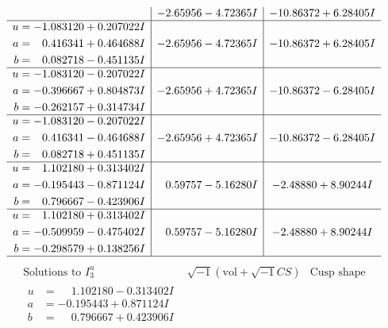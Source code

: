 \documentclass[1p]{elsarticle_modified}
\theoremstyle{definition}
\newcommand{\I}{\sqrt{-1}}
\begin{document}
$$\begin{array}{c|c|c}
 & -2.65956 - 4.72365 I & -10.86372 + 6.28405 I \\ \hline\begin{aligned}
u &= -1.083120 + 0.207022 I \\
a &= \phantom{-}0.416341 + 0.464688 I \\
b &= \phantom{-}0.082718 - 0.451135 I\end{aligned}
 & -2.65956 - 4.72365 I & -10.86372 + 6.28405 I \\ \hline\begin{aligned}
u &= -1.083120 - 0.207022 I \\
a &= -0.396667 + 0.804873 I \\
b &= -0.262157 + 0.314734 I\end{aligned}
 & -2.65956 + 4.72365 I & -10.86372 - 6.28405 I \\ \hline\begin{aligned}
u &= -1.083120 - 0.207022 I \\
a &= \phantom{-}0.416341 - 0.464688 I \\
b &= \phantom{-}0.082718 + 0.451135 I\end{aligned}
 & -2.65956 + 4.72365 I & -10.86372 - 6.28405 I \\ \hline\begin{aligned}
u &= \phantom{-}1.102180 + 0.313402 I \\
a &= -0.195443 - 0.871124 I \\
b &= \phantom{-}0.796667 - 0.423906 I\end{aligned}
 & \phantom{-}0.59757 - 5.16280 I & -2.48880 + 8.90244 I \\ \hline\begin{aligned}
u &= \phantom{-}1.102180 + 0.313402 I \\
a &= -0.509959 - 0.475402 I \\
b &= -0.298579 + 0.138256 I\end{aligned}
 & \phantom{-}0.59757 - 5.16280 I & -2.48880 + 8.90244 I\\
 \hline 
 \end{array}$$\newpage$$\begin{array}{c|c|c}  
\text{Solutions to }I^u_{3}& \I (\text{vol} + \sqrt{-1}CS) & \text{Cusp shape}\\
 \hline 
\begin{aligned}
u &= \phantom{-}1.102180 - 0.313402 I \\
a &= -0.195443 + 0.871124 I \\
b &= \phantom{-}0.796667 + 0.423906 I\end{aligned}

\end{array}$$
\end{document}
